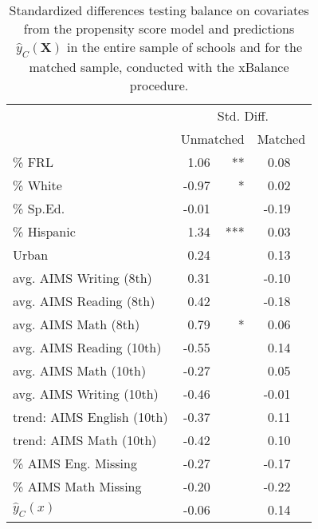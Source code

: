 \documentclass[12pt]{article}\usepackage[]{graphicx}\usepackage[]{color}
\newcommand{\yhat}{\hat{y}_C}
\newcommand{\covMat}{\bm{X}}
\newcommand{\covVec}{x}
\begin{document}
\begin{table}[ht]
\centering
\begin{tabular}{lrrrr}
  \hline
  & \multicolumn{4}{c}{Std. Diff.} \\
 &\multicolumn{2}{c}{Unmatched}&\multicolumn{2}{c}{Matched}\\
 \hline
\% FRL & 1.06 & **  & 0.08 &     \\ 
  \% White & -0.97 & *   & 0.02 &     \\ 
  \% Sp.Ed. & -0.01 &     & -0.19 &     \\ 
  \% Hispanic & 1.34 & *** & 0.03 &     \\ 
  Urban & 0.24 &     & 0.13 &     \\ 
  avg. AIMS Writing (8th) & 0.31 &     & -0.10 &     \\ 
  avg. AIMS Reading (8th) & 0.42 &     & -0.18 &     \\ 
  avg. AIMS Math (8th) & 0.79 & *   & 0.06 &     \\ 
  avg. AIMS Reading (10th) & -0.55 &     & 0.14 &     \\ 
  avg. AIMS Math (10th) & -0.27 &     & 0.05 &     \\ 
  avg. AIMS Writing (10th) & -0.46 &     & -0.01 &     \\ 
  trend: AIMS English (10th) & -0.37 &     & 0.11 &     \\ 
  trend: AIMS Math (10th) & -0.42 &     & 0.10 &     \\ 
  \% AIMS Eng. Missing & -0.27 &     & -0.17 &     \\ 
  \% AIMS Math Missing & -0.20 &     & -0.22 &     \\ 
  $\yhat (\covVec)$ & -0.06 &     & 0.14 &     \\ 
   \hline
\end{tabular}
\caption{Standardized differences testing balance on
  covariates from the propensity score model and predictions $\hat{y}_C(\covMat)$ in the entire sample of schools and for the matched sample, conducted with the xBalance procedure.} 
\label{table:balance}
\end{table}
\end{document}

